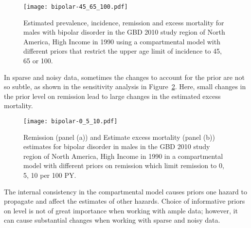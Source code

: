     \begin{figure}[h]
        \begin{center}
            \texttt{[image: bipolar-45\_65\_100.pdf]}
            \caption{Estimated prevalence, incidence, remission and
              excess mortality for males with bipolar
              disorder in the GBD 2010 study region of North America, High Income
              in 1990 using a compartmental model with
              different priors that restrict the upper age limit of
              incidence to 45, 65 or 100.}
            \label{fig:app-bipolar onset}
        \end{center}
    \end{figure}

In sparse and noisy data, sometimes the changes to account for the prior
are not so subtle, as shown in the sensitivity analysis in
Figure~\ref{fig:app-bipolar remission}.  Here, small changes in the
prior level on remission lead to large changes in the estimated excess mortality.

    \begin{figure}[h]
        \begin{center}
            \texttt{[image: bipolar-0\_5\_10.pdf]}
            \caption{Remission (panel (a)) and Estimate excess
              mortality (panel (b)) estimates for bipolar disorder in
              males in the GBD 2010 study region of North America, High Income
              in 1990 in a compartmental model
              with different priors on remission which limit remission
              to 0, 5, 10 per 100 PY.}
            \label{fig:app-bipolar remission}
        \end{center}
    \end{figure}

The internal consistency in the compartmental model causes priors one hazard to propagate and affect the estimates of other hazards.  Choice of informative priors on level is not of great importance when working with ample data; however, it can cause substantial changes when working with sparse and noisy data.




